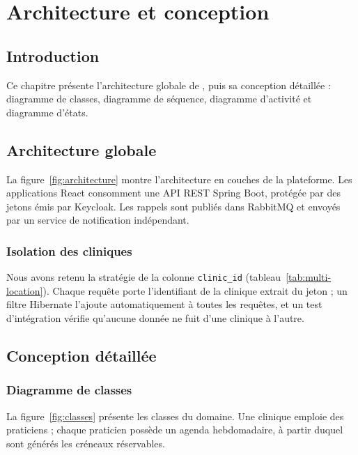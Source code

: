 \chapter{Architecture et conception}\label{ch:conception}

\section*{Introduction}
Ce chapitre présente l'architecture globale de \nomprojet, puis sa conception détaillée : diagramme de classes, diagramme de séquence, diagramme d'activité et diagramme d'états.

\section{Architecture globale}
La figure~\ref{fig:architecture} montre l'architecture en couches de la plateforme. Les applications React consomment une API REST Spring Boot, protégée par des jetons émis par Keycloak. Les rappels sont publiés dans RabbitMQ et envoyés par un service de notification indépendant.


\subsection{Isolation des cliniques}
Nous avons retenu la stratégie de la colonne \texttt{clinic\_id} (tableau~\ref{tab:multi-location}). Chaque requête porte l'identifiant de la clinique extrait du jeton ; un filtre Hibernate l'ajoute automatiquement à toutes les requêtes, et un test d'intégration vérifie qu'aucune donnée ne fuit d'une clinique à l'autre.

\section{Conception détaillée}

\subsection{Diagramme de classes}
La figure~\ref{fig:classes} présente les classes du domaine. Une clinique emploie des praticiens ; chaque praticien possède un agenda hebdomadaire, à partir duquel sont générés les créneaux réservables.


